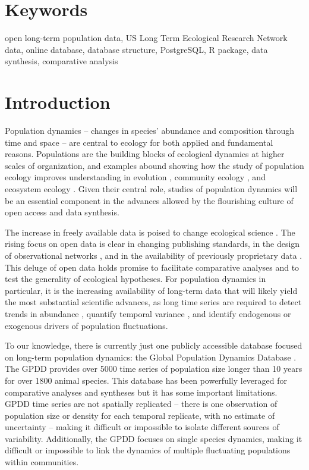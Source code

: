 \documentclass{article}\usepackage[]{graphicx}\usepackage[]{color}
\begin{document}
\section*{Keywords}
\linenumbers
open long-term population data, US Long Term Ecological Research Network data, online database, database structure, PostgreSQL, R package, data synthesis, comparative analysis

\newpage
\section*{Introduction}
\linenumbers

Population dynamics – changes in species’ abundance and composition through time and space – are central to ecology for both applied and fundamental reasons. Populations are the building blocks of ecological dynamics at higher scales of organization, and examples abound showing how the study of population ecology improves understanding in evolution \citep{Metcalf2007}, community ecology \citep{Levine2009}, and ecosystem ecology \citep{Medvigy2009,Fisher2018}. Given their central role, studies of population dynamics will be an essential component in the advances allowed by the flourishing culture of open access and data synthesis.

The increase in freely available data is poised to change ecological science \citep{Laurance2016}. The rising focus on open data is clear in changing publishing standards, in the design of observational networks \citep{schimel2007neon}, and in the availability of previously proprietary data \citep{Kratz2003,Bechtold2005}. This deluge of open data holds promise to facilitate comparative analyses and to test the generality of ecological hypotheses. For population dynamics in particular, it is the increasing availability of long-term data that will likely yield the most substantial scientific advances, as long time series are required to detect trends in abundance \citep{Lindenmayer2012}, quantify temporal variance \citep{Compagnoni2016}, and identify endogenous \citep{Knape2012} or exogenous \citep{Hampton2013} drivers of population fluctuations.

To our knowledge, there is currently just one publicly accessible database focused on long-term population dynamics: the Global Population Dynamics Database \citep[GPDD,][]{Inchausti2001}. The GPDD provides over 5000 time series of population size longer than 10 years for over 1800 animal species. This database has been powerfully leveraged for comparative analyses and syntheses \citep[e.g.,][]{Knape2012} but it has some important limitations. GPDD time series are not spatially replicated – there is one observation of population size or density for each temporal replicate, with no estimate of uncertainty – making it difficult or impossible to isolate different sources of variability. Additionally, the GPDD focuses on single species dynamics, making it difficult or impossible to link the dynamics of multiple fluctuating populations within communities.  
\end{document}
